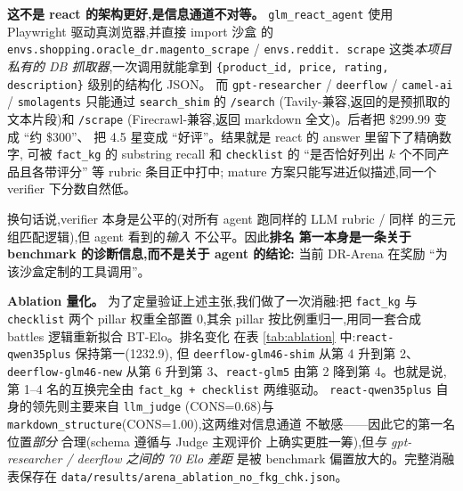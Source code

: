 \documentclass[UTF8,11pt]{ctexart}
\newcommand{\arena}{DR-Arena}
\begin{document}
\textbf{这不是 react 的架构更好,是信息通道不对等。}
\texttt{glm\_react\_agent} 使用 Playwright 驱动真浏览器,并直接 import 沙盒
的 \texttt{envs.shopping.oracle\_dr.magento\_scrape} / \texttt{envs.reddit.
scrape} 这类\emph{本项目私有的 DB 抓取器},一次调用就能拿到
\texttt{\{product\_id, price, rating, description\}} 级别的结构化 JSON。
而 \texttt{gpt-researcher} / \texttt{deerflow} / \texttt{camel-ai} /
\texttt{smolagents} 只能通过 \texttt{search\_shim} 的 \texttt{/search}
(Tavily-兼容,返回的是预抓取的文本片段)和 \texttt{/scrape}
(Firecrawl-兼容,返回 markdown 全文)。后者把 \$299.99 变成 ``约 \$300''、
把 4.5 星变成 ``好评''。结果就是 react 的 answer 里留下了精确数字,
可被 \texttt{fact\_kg} 的 substring recall 和 \texttt{checklist} 的
``是否恰好列出 $k$ 个不同产品且各带评分'' 等 rubric 条目正中打中;
mature 方案只能写进近似描述,同一个 verifier 下分数自然低。

换句话说,verifier 本身是公平的(对所有 agent 跑同样的 LLM rubric / 同样
的三元组匹配逻辑),但 agent 看到的\emph{输入} 不公平。因此\textbf{排名
第一本身是一条关于 benchmark 的诊断信息,而不是关于 agent 的结论:}
当前 \arena{} 在奖励 ``为该沙盒定制的工具调用''。

\textbf{Ablation 量化。} 为了定量验证上述主张,我们做了一次消融:把
\texttt{fact\_kg} 与 \texttt{checklist} 两个 pillar 权重全部置 0,其余
pillar 按比例重归一,用同一套合成 battles 逻辑重新拟合 BT-Elo。排名变化
在表 \ref{tab:ablation} 中:\texttt{react-qwen35plus} 保持第一(1232.9),
但 \texttt{deerflow-glm46-shim} 从第 4 升到第 2、\texttt{deerflow-glm46-new}
从第 6 升到第 3、\texttt{react-glm5} 由第 2 降到第 4。也就是说,第 1--4
名的互换完全由 \texttt{fact\_kg + checklist} 两维驱动。
\texttt{react-qwen35plus} 自身的领先则主要来自 \texttt{llm\_judge}
(CONS=0.68)与 \texttt{markdown\_structure}(CONS=1.00),这两维对信息通道
不敏感——因此它的第一名位置\emph{部分} 合理(schema 遵循与 Judge 主观评价
上确实更胜一筹),但\emph{与 gpt-researcher / deerflow 之间的 70 Elo 差距}
是被 benchmark 偏置放大的。完整消融表保存在
\texttt{data/results/arena\_ablation\_no\_fkg\_chk.json}。
\end{document}
